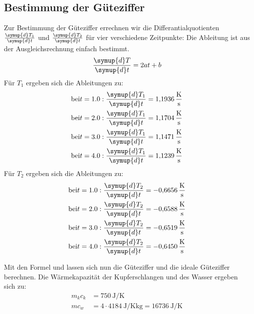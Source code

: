 \subsection{Bestimmung der Güteziffer}
Zur Bestimmung der Güteziffer errechnen wir die Differantialquotienten $\frac{\symup{d}T_1}{\symup{d}t}$ und $\frac{\symup{d}T_2}{\symup{d}t}$ für vier verschiedene Zeitpunkte:
Die Ableitung ist aus der Ausgleichsrechnung einfach bestimmt.
\begin{equation}
  \frac{\symup{d}T}{\symup{d}t} = 2at + b
\end{equation}
Für $T_1$ ergeben sich die Ableitungen zu:
\begin{gather*}
  \text{bei} t=1.0 : \frac{\symup{d}T_1}{\symup{d}t} = \SI{1.1936}{\kelvin\per\second}\\  %
  \text{bei} t=2.0 : \frac{\symup{d}T_1}{\symup{d}t} = \SI{1.1704}{\kelvin\per\second}\\
  \text{bei} t=3.0 : \frac{\symup{d}T_1}{\symup{d}t} = \SI{1.1471}{\kelvin\per\second}\\
  \text{bei} t=4.0 : \frac{\symup{d}T_1}{\symup{d}t} = \SI{1.1239}{\kelvin\per\second}
\end{gather*}
Für $T_2$ ergeben sich die Ableitungen zu:
\begin{gather*}
  \text{bei} t=1.0 : \frac{\symup{d}T_2}{\symup{d}t} = \SI{-0.6656}{\kelvin\per\second}\\
  \text{bei} t=2.0 : \frac{\symup{d}T_2}{\symup{d}t} = \SI{-0.6588}{\kelvin\per\second}\\
  \text{bei} t=3.0 : \frac{\symup{d}T_2}{\symup{d}t} = \SI{-0.6519}{\kelvin\per\second}\\
  \text{bei} t=4.0 : \frac{\symup{d}T_2}{\symup{d}t} = \SI{-0.6450}{\kelvin\per\second}
\end{gather*}

Mit den Formel  und  lassen sich nun die Güteziffer und die ideale Güteziffer berechnen.
Die Wärmekapazität der Kupferschlangen und des Wasser ergeben sich zu:
\begin{align*}
  m_kc_k &= \SI{750}{\joule\per\kelvin}\\
  mc_w &= 4 \cdot \SI{4184}{\joule\per\kelvin\kilo\gram} = \SI{16736}{\joule\per\kelvin} %
\end{align*}

